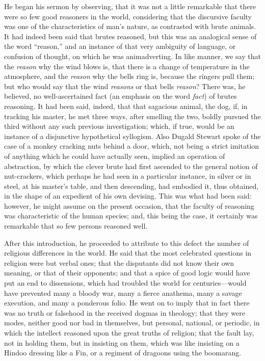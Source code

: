 He began his sermon by observing, that it was not a little
remarkable that there were so few good reasoners in the world,
considering that the discursive faculty was one of the characteristics
of man's nature, as contrasted with brute animals. It had indeed been
said that brutes reasoned, but this was an analogical sense of the
word ``reason,'' and an instance of that very ambiguity of
language, or confusion of thought, on which he was animadverting.
In like manner, we say that the \emph{reason} why the wind blows is, that
there is a change of temperature in the atmosphere, and the \emph{reason} why
the bells ring is, because the ringers pull them; but who would say
that the wind \emph{reasons} or that bells \emph{reason}? There was, he believed, no
well-ascertained fact (an emphasis on the word \emph{fact}) of brutes
reasoning. It had been said, indeed, that that sagacious animal, the
dog, if, in tracking his master, he met three ways, after smelling the
two, boldly pursued the third without any such previous investigation;
which, if true, would be an instance of a disjunctive hypothetical
syllogism. Also Dugald Stewart spoke of the case of a monkey cracking
nuts behind a door, which, not being a strict imitation of anything
which he could have actually seen, implied an operation of
abstraction, by which the clever brute had first ascended to the
general notion of nut-crackers, which perhaps he had seen in a
particular instance, in silver or in steel, at his master's table, and
then descending, had embodied it, thus obtained, in the shape of an
expedient of his own devising. This was what had been said: however,
he might assume on the present occasion, that the faculty of reasoning
was characteristic of the human species; and, this being the case, it
certainly was remarkable that so few persons reasoned well.

After this introduction, he proceeded to attribute to this defect
the number of religious differences in the world. He said that the
most celebrated questions in religion were but verbal ones; that the
disputants did not know their own meaning, or that of their opponents;
and that a spice of good logic would have put an end to
dissensions, which had troubled the world for centuries—would have
prevented many a bloody war, many a fierce anathema, many a savage
execution, and many a ponderous folio. He went on to imply that in
fact there was no truth or falsehood in the received dogmas in
theology; that they were modes, neither good nor bad in themselves,
but personal, national, or periodic, in which the intellect reasoned
upon the great truths of religion; that the fault lay, not in holding
them, but in insisting on them, which was like insisting on a Hindoo
dressing like a Fin, or a regiment of dragoons using the boomarang.

